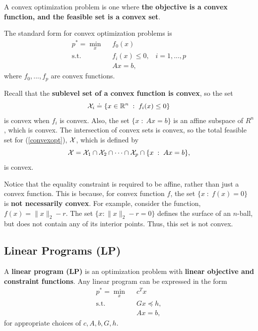 \documentclass[12pt]{article}
\begin{document}
A convex optimization problem is one where \textbf{the objective is a convex function, and the feasible set is a convex set}. 

The standard form for convex optimization problems is
%
\begin{equation}
\begin{aligned}
p^* = \min_{x} \;\;& f_0(x) \\
\text{s.t. } & f_i (x) \leq 0, \;\;\; i = 1,...,p \\
& Ax = b,
\end{aligned}\label{convexopt}
\end{equation}
%
where $f_0, ..., f_p$ are convex functions.

Recall that the \textbf{sublevel set of a convex function is convex}, so the set 
%
\begin{equation*}
{\mathcal X}_i \doteq \{x \in { {\mathbb R}^{n} } \; : \; f_i (x) \leq 0\}
\end{equation*} 
% 
is convex when $f_i$ is convex. Also, the set $\{x \; : \; Ax = b\}$ is an affine subspace of $R^{n}$, which is convex. The intersection of convex sets is convex, so the total feasible set for (\ref{convexopt}), ${\mathcal X}$, which is defined by
%
\begin{equation*}
{\mathcal X} = {\mathcal X}_1 \cap {\mathcal X}_2 \cap \cdots \cap {\mathcal X}_p \cap \{x \; : \; Ax = b\},
\end{equation*}
%
is convex. 

\begin{remark} Notice that the equality constraint is required to be affine, rather than just a convex function. This is because, for convex function $f$, the set $\{x \; : \; f(x) = 0\}$ is \textbf{not necessarily convex}. For example, consider the function, $f(x) = \|x\|_2 - r$. The set $\{x : \|x\|_2 - r = 0\}$ defines the surface of an $n$-ball, but does not contain any of its interior points. Thus, this set is not convex.
\end{remark}

\subsection{Linear Programs (LP)}

A \textbf{linear program (LP)} is an optimization problem with \textbf{linear objective and constraint functions}. Any linear program can be expressed in the form
%
\begin{equation}
\begin{aligned}
p^* = \min_{x} \;\; & c^T x \\
\text{s.t. } & Gx \preceq h, \\
& Ax = b,
\end{aligned}\label{LP}
\end{equation}
%
for appropriate choices of $c, A, b, G, h$.
\end{document}
